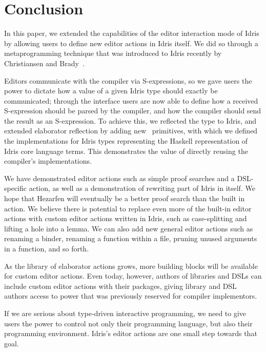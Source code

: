 \section{Conclusion}\label{sec:conclusion}

In this paper, we extended the capabilities of the editor interaction mode of
Idris by allowing users to define new editor actions in Idris itself. We did
so through a metaprogramming technique that was introduced to Idris recently by
Christiansen and Brady~\cite{elabref}.

Editors communicate with the compiler via S-expressions, so we gave
users the power to dictate how a value of a given Idris type should
exactly be communicated; through the  interface users
are now able to define how a received S-expression should be parsed by
the compiler, and how the compiler should send the result as an
S-expression. To achieve this, we reflected the  type to
Idris, and extended elaborator reflection by adding new \Elab\
primitives, with which we defined the  implementations
for Idris types representing the Haskell representation of Idris core
language terms. This demonstrates the value of directly reusing the
compiler's implementations.

We have demonstrated editor actions such as simple proof searches and
a DSL-specific action, as well as a demonstration of rewriting part of
Idris in itself. We hope that Hezarfen will eventually be a better
proof search than the built in action. We believe there is potential
to replace even more of the built-in editor actions with custom editor
actions written in Idris, such as case-splitting and lifting a hole
into a lemma. We can also add new general editor actions such as
renaming a binder, renaming a function within a file, pruning unused
arguments in a function, and so forth.

As the library of elaborator actions grows, more building blocks will
be available for custom editor actions. Even today, however, authors
of libraries and DSLs can include custom editor actions with their
packages, giving library and DSL authors access to power that was
previously reserved for compiler implementors.

If we are serious about type-driven interactive programming, we need
to give users the power to control not only their programming
language, but also their programming environment. Idris's editor
actions are one small step towards that goal.

